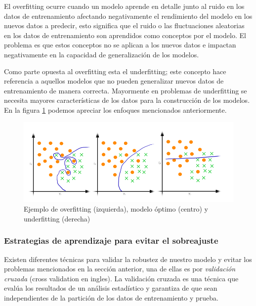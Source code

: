 El overfitting ocurre cuando un modelo aprende en detalle junto al ruido en los datos de entrenamiento afectando negativamente el rendimiento del modelo en los nuevos datos a predecir, esto significa que el ruido o las fluctuaciones aleatorias en los datos de entrenamiento son aprendidos como conceptos por el modelo. El problema es que estos conceptos no se aplican a los nuevos datos e impactan negativamente en la capacidad de generalización de los modelos.

Como parte opuesta al overfitting esta el  underfitting; este concepto hace referencia a aquellos modelos que no pueden generalizar nuevos datos de entrenamiento de manera correcta. Mayormente en problemas de underfitting se necesita mayores características de los datos para la construcción de los modelos. En la figura \ref{Fig: overUnder} podemos apreciar los enfoques mencionados anteriormente.

\begin{figure}[h]
 \centering
  \includegraphics[scale=0.4,keepaspectratio=true,clip=true]{imagenes/MarcoTeorico/OverFUnderF.png}
  \caption{Ejemplo de overfitting (izquierda), modelo óptimo (centro) y underfitting (derecha) }%
	\label{Fig: overUnder}
\end{figure}



\subsubsection{Estrategias de aprendizaje para evitar el sobreajuste}
Existen diferentes técnicas para validar la robustez de nuestro modelo y evitar los problemas mencionados en la sección anterior, una de ellas es por  \textit{validación cruzada} (cross validation en ingles). La validación cruzada es una técnica que evalúa los resultados de un análisis estadístico y garantiza de que sean independientes de la partición de los datos de entrenamiento y prueba. 

